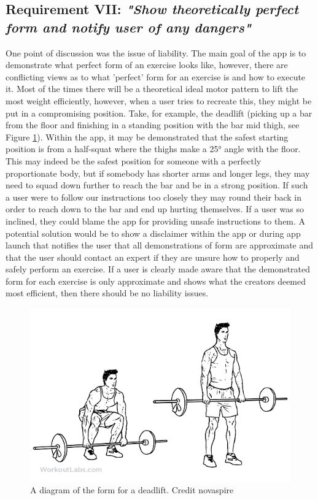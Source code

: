 \documentclass{l4proj}
\begin{document}
\subsection{\textbf{Requirement VII:} \textit{"Show theoretically perfect form and notify user of any dangers"}}
\label{requirement_VII}

One point of discussion was the issue of liability. The main goal of the app is to demonstrate what perfect form of an exercise looks like, however, there are conflicting views as to what 'perfect' form for an exercise is and how to execute it. Most of the times there will be a theoretical ideal motor pattern to lift the most weight efficiently, however, when a user tries to recreate this, they might be put in a compromising position. Take, for example, the deadlift (picking up a bar from the floor and finishing in a standing position with the bar mid thigh, see Figure \ref{fig:deadlift}). Within the app, it may be demonstrated that the safest starting position is from a half-squat where the thighs make a 25° angle with the floor. This may indeed be the safest position for someone with a perfectly proportionate body, but if somebody has shorter arms and longer legs, they may need to squad down further to reach the bar and be in a strong position. If such a user were to follow our instructions too closely they may round their back in order to reach down to the bar and end up hurting themselves. If a user was so inclined, they could blame the app for providing unsafe instructions to them. A potential solution would be to show a disclaimer within the app or during app launch that notifies the user that all demonstrations of form are approximate and that the user should contact an expert if they are unsure how to properly and safely perform an exercise. If a user is clearly made aware that the demonstrated form for each exercise is only approximate and shows what the creators deemed most efficient, then there should be no liability issues. 
\begin{figure}
\centering
\includegraphics[scale=0.5]{images/deadlift.png}
\caption{A diagram of the form for a deadlift. Credit novaspire \cite{novaspire}}
\label{fig:deadlift}
\end{figure}
\end{document}
